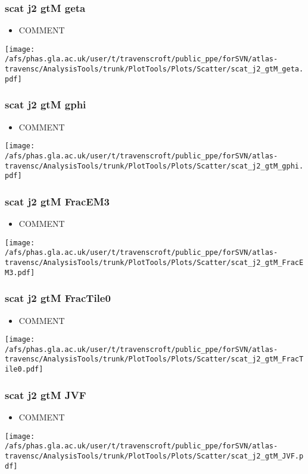 \documentclass{beamer}
\begin{document}
\begin{frame}
\frametitle{scat j2 gtM geta}
\begin{itemize}
\item COMMENT
\end{itemize}
\begin{center}
\texttt{[image: /afs/phas.gla.ac.uk/user/t/travenscroft/public\_ppe/forSVN/atlas-travensc/AnalysisTools/trunk/PlotTools/Plots/Scatter/scat\_j2\_gtM\_geta.pdf]}
\end{center}
\end{frame}

\begin{frame}
\frametitle{scat j2 gtM gphi}
\begin{itemize}
\item COMMENT
\end{itemize}
\begin{center}
\texttt{[image: /afs/phas.gla.ac.uk/user/t/travenscroft/public\_ppe/forSVN/atlas-travensc/AnalysisTools/trunk/PlotTools/Plots/Scatter/scat\_j2\_gtM\_gphi.pdf]}
\end{center}
\end{frame}

\begin{frame}
\frametitle{scat j2 gtM FracEM3}
\begin{itemize}
\item COMMENT
\end{itemize}
\begin{center}
\texttt{[image: /afs/phas.gla.ac.uk/user/t/travenscroft/public\_ppe/forSVN/atlas-travensc/AnalysisTools/trunk/PlotTools/Plots/Scatter/scat\_j2\_gtM\_FracEM3.pdf]}
\end{center}
\end{frame}

\begin{frame}
\frametitle{scat j2 gtM FracTile0}
\begin{itemize}
\item COMMENT
\end{itemize}
\begin{center}
\texttt{[image: /afs/phas.gla.ac.uk/user/t/travenscroft/public\_ppe/forSVN/atlas-travensc/AnalysisTools/trunk/PlotTools/Plots/Scatter/scat\_j2\_gtM\_FracTile0.pdf]}
\end{center}
\end{frame}

\begin{frame}
\frametitle{scat j2 gtM JVF}
\begin{itemize}
\item COMMENT
\end{itemize}
\begin{center}
\texttt{[image: /afs/phas.gla.ac.uk/user/t/travenscroft/public\_ppe/forSVN/atlas-travensc/AnalysisTools/trunk/PlotTools/Plots/Scatter/scat\_j2\_gtM\_JVF.pdf]}
\end{center}
\end{frame}
\end{document}
